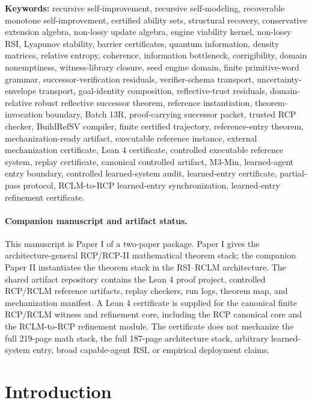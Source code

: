 \documentclass[11pt]{article}
\newcommand{\1}{\mathbf{1}}
\begin{document}
\textbf{Keywords:} recursive self-improvement, recursive self-modeling, recoverable monotone self-improvement, certified ability sets, structural recovery, conservative extension algebra, non-lossy update algebra, engine viability kernel, non-lossy RSI, Lyapunov stability, barrier certificates, quantum information, density matrices, relative entropy, coherence, information bottleneck, corrigibility, domain nonemptiness, witness-library closure, seed engine domain, finite primitive-word grammar, successor-verification residuals, verifier-schema transport, uncertainty-envelope transport, goal-identity composition, reflective-trust residuals, domain-relative robust reflective successor theorem, reference instantiation, theorem-invocation boundary, Batch 13R, proof-carrying successor packet, trusted RCP checker, BuildRefSV compiler, finite certified trajectory, reference-entry theorem, mechanization-ready artifact, executable reference instance, external mechanization certificate, Lean 4 certificate, controlled executable reference system, replay certificate, canonical controlled artifact, M3-Min, learned-agent entry boundary, controlled learned-system audit, learned-entry certificate, partial-pass protocol, RCLM-to-RCP learned-entry synchronization, learned-entry refinement certificate.



\paragraph{Companion manuscript and artifact status.}
This manuscript is Paper I of a two-paper package.  Paper I gives the architecture-general RCP/RCP-II mathematical theorem stack; the companion Paper II instantiates the theorem stack in the RSI--RCLM architecture.  The shared artifact repository contains the Lean 4 proof project, controlled RCP/RCLM reference artifacts, replay checkers, run logs, theorem map, and mechanization manifest.  A Lean 4 certificate is supplied for the canonical finite RCP/RCLM witness and refinement core, including the RCP canonical core and the RCLM-to-RCP refinement module.  The certificate does not mechanize the full 219-page math stack, the full 187-page architecture stack, arbitrary learned-system entry, broad capable-agent RSI, or empirical deployment claims.

\tableofcontents
\newpage

\section{Introduction}
\end{document}
